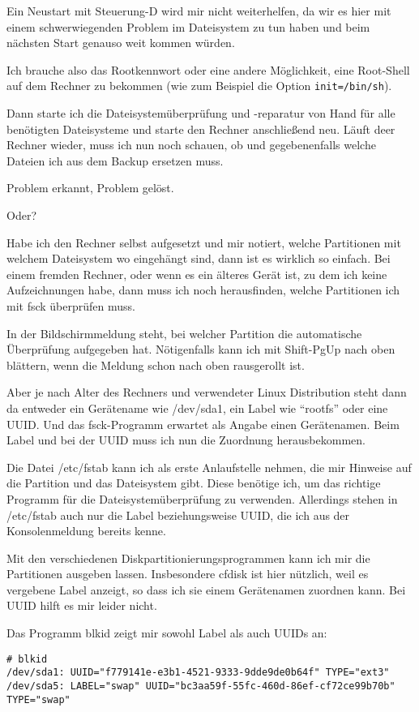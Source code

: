 Ein Neustart mit Steuerung-D wird mir nicht weiterhelfen, da wir es hier mit
einem schwerwiegenden Problem im Dateisystem zu tun haben und beim nächsten
Start genauso weit kommen würden.

Ich brauche also das Rootkennwort oder eine andere Möglichkeit, eine
Root-Shell auf dem Rechner zu bekommen (wie zum Beispiel die Option
\verb?init=/bin/sh?).

Dann starte ich die Dateisystemüberprüfung und -reparatur von Hand für alle
benötigten Dateisysteme und starte den Rechner anschließend neu. Läuft deer
Rechner wieder, muss ich nun noch schauen, ob und gegebenenfalls welche
Dateien ich aus dem Backup ersetzen muss.

Problem erkannt, Problem gelöst.

Oder?

Habe ich den Rechner selbst aufgesetzt und mir notiert, welche Partitionen mit
welchem Dateisystem wo eingehängt sind, dann ist es wirklich so einfach. Bei
einem fremden Rechner, oder wenn es ein älteres Gerät ist, zu dem ich keine
Aufzeichnungen habe, dann muss ich noch herausfinden, welche Partitionen ich
mit fsck überprüfen muss.

In der Bildschirmmeldung steht, bei welcher Partition die automatische
Überprüfung aufgegeben hat. Nötigenfalls kann ich mit Shift-PgUp nach oben
blättern, wenn die Meldung schon nach oben rausgerollt ist.

Aber je nach Alter des Rechners und verwendeter Linux Distribution steht dann
da entweder ein Gerätename wie /dev/sda1, ein Label wie ``rootfs'' oder eine
UUID. Und das fsck-Programm erwartet als Angabe einen Gerätenamen. Beim Label
und bei der UUID muss ich nun die Zuordnung herausbekommen.

Die Datei /etc/fstab kann ich als erste Anlaufstelle nehmen, die mir Hinweise
auf die Partition und das Dateisystem gibt. Diese benötige ich, um das
richtige Programm für die Dateisystemüberprüfung zu verwenden. Allerdings
stehen in /etc/fstab auch nur die Label beziehungsweise UUID, die ich aus der
Konsolenmeldung bereits kenne.

Mit den verschiedenen Diskpartitionierungsprogrammen kann ich mir die
Partitionen ausgeben lassen. Insbesondere cfdisk ist hier nützlich, weil es
vergebene Label anzeigt, so dass ich sie einem Gerätenamen zuordnen kann. Bei
UUID hilft es mir leider nicht.

Das Programm blkid zeigt mir sowohl Label als auch UUIDs an:
\begin{verbatim}
# blkid
/dev/sda1: UUID="f779141e-e3b1-4521-9333-9dde9de0b64f" TYPE="ext3" 
/dev/sda5: LABEL="swap" UUID="bc3aa59f-55fc-460d-86ef-cf72ce99b70b" TYPE="swap" 
\end{verbatim}

